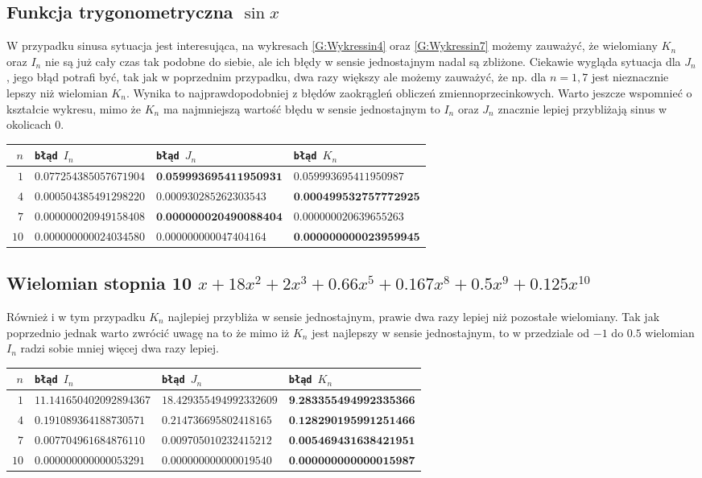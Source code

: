 \documentclass[11pt,leqno]{article}
\begin{document}
\subsection{Funkcja trygonometryczna $\sin x$}
W przypadku sinusa sytuacja jest interesująca, na wykresach \eqref{G:Wykressin4} oraz \eqref{G:Wykressin7} możemy zauważyć, że wielomiany $K_n$ oraz $I_n$ nie są już cały czas tak podobne do siebie, ale ich błędy w sensie jednostajnym nadal są zbliżone. Ciekawie wygląda sytuacja dla $J_n$, jego błąd potrafi być, tak jak w poprzednim przypadku, dwa razy większy ale możemy zauważyć, że np. dla $n = 1, 7$ jest nieznacznie lepszy niż wielomian $K_n$. Wynika to najprawdopodobniej z błędów zaokrągleń obliczeń zmiennoprzecinkowych. Warto jeszcze wspomnieć o kształcie wykresu, mimo że $K_n$ ma najmniejszą wartość błędu w sensie jednostajnym to $I_n$ oraz $J_n$ znacznie lepiej przybliżają sinus w okolicach $0$.
\begin{center}
    \begin{tabular}{r|l|l|l}
        \texttt{$n$} & \texttt{błąd $I_n$} & \texttt{błąd $J_n$} & \texttt{błąd $K_n$} \\ \hline
        $1$ & $0.077254385057671904$ & $\textbf{0.059993695411950931}$ & $0.059993695411950987$ \\
        $4$ & $0.000504385491298220$ & $0.000930285262303543$ & $\textbf{0.000499532757772925}$ \\
        $7$ & $0.000000020949158408$ & $\textbf{0.000000020490088404}$ & $0.000000020639655263$ \\
        $10$ & $0.000000000024034580$ & $0.000000000047404164$ & $\textbf{0.000000000023959945}$ \\
    \end{tabular}
\end{center}
\subsection{Wielomian stopnia 10 $x + 18x^2 + 2x^3 + 0.66x^5 + 0.167x^8 + 0.5x^9 + 0.125x^{10}$}
Również i w tym przypadku $K_n$ najlepiej przybliża w sensie jednostajnym, prawie dwa razy lepiej niż pozostałe wielomiany. Tak jak poprzednio jednak warto zwrócić uwagę na to że mimo iż $K_n$ jest najlepszy w sensie jednostajnym, to w przedziale od $-1$ do $0.5$ wielomian $I_n$ radzi sobie mniej więcej dwa razy lepiej.
\begin{center}
    \begin{tabular}{r|l|l|l}\label{T:Tabelapoly}
        \texttt{$n$} & \texttt{błąd $I_n$} & \texttt{błąd $J_n$} & \texttt{błąd $K_n$} \\ \hline
        $1$ & $11.141650402092894367$ & $18.429355494992332609$ & $\textbf{9.283355494992335366}$ \\
        $4$ & $0.191089364188730571$ & $0.214736695802418165$ & $\textbf{0.128290195991251466}$ \\
        $7$ & $0.007704961684876110$ & $0.009705010232415212$ & $\textbf{0.005469431638421951}$ \\
        $10$ & $0.000000000000053291$ & $0.000000000000019540$ & $\textbf{0.000000000000015987}$ \\
    \end{tabular}
\end{center}
\end{document}
